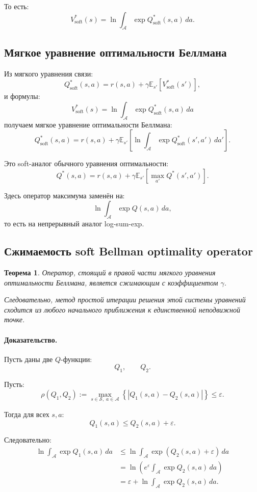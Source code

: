 \documentclass[12pt,a4paper]{article}
\newtheorem{theorem}{Теорема}
\begin{document}
То есть:
\[
V^\ast_{\mathrm{soft}}(s)
=
\ln
\int_{\mathcal A}
\exp Q^\ast_{\mathrm{soft}}(s,a)
\,da.
\]

\subsection{Мягкое уравнение оптимальности Беллмана}

Из мягкого уравнения связи:
\[
Q^\ast_{\mathrm{soft}}(s,a)
=
r(s,a)
+
\gamma
\mathbb E_{s'}
\left[
V^\ast_{\mathrm{soft}}(s')
\right],
\]
и формулы:
\[
V^\ast_{\mathrm{soft}}(s)
=
\ln
\int_{\mathcal A}
\exp Q^\ast_{\mathrm{soft}}(s,a)
\,da
\]
получаем мягкое уравнение оптимальности Беллмана:
\[
Q^\ast_{\mathrm{soft}}(s,a)
=
r(s,a)
+
\gamma
\mathbb E_{s'}
\left[
\ln
\int_{\mathcal A}
\exp Q^\ast_{\mathrm{soft}}(s',a')
\,da'
\right].
\]

Это soft-аналог обычного уравнения оптимальности:
\[
Q^\ast(s,a)
=
r(s,a)
+
\gamma
\mathbb E_{s'}
\left[
\max_{a'}
Q^\ast(s',a')
\right].
\]

Здесь оператор максимума заменён на:
\[
\ln
\int_{\mathcal A}
\exp Q(s,a)
\,da,
\]
то есть на непрерывный аналог log-sum-exp.

\subsection{Сжимаемость soft Bellman optimality operator}

\begin{theorem}
Оператор, стоящий в правой части мягкого уравнения оптимальности Беллмана, является сжимающим с коэффициентом $\gamma$.

Следовательно, метод простой итерации решения этой системы уравнений сходится из любого начального приближения к единственной неподвижной точке.
\end{theorem}

\paragraph{Доказательство.}

Пусть даны две $Q$-функции:
\[
Q_1,
\qquad
Q_2.
\]

Пусть:
\[
\rho(Q_1,Q_2)
:=
\max_{s\in\mathcal S,\;a\in\mathcal A}
\left\{
|Q_1(s,a)-Q_2(s,a)|
\right\}
\le
\varepsilon.
\]

Тогда для всех $s,a$:
\[
Q_1(s,a)
\le
Q_2(s,a)+\varepsilon.
\]

Следовательно:
\[
\begin{aligned}
\ln
\int_{\mathcal A}
\exp Q_1(s,a)
\,da
&\le
\ln
\int_{\mathcal A}
\exp
\left(
Q_2(s,a)+\varepsilon
\right)
\,da
\\
&=
\ln
\left(
e^\varepsilon
\int_{\mathcal A}
\exp Q_2(s,a)
\,da
\right)
\\
&=
\varepsilon
+
\ln
\int_{\mathcal A}
\exp Q_2(s,a)
\,da.
\end{aligned}
\]
\end{document}
